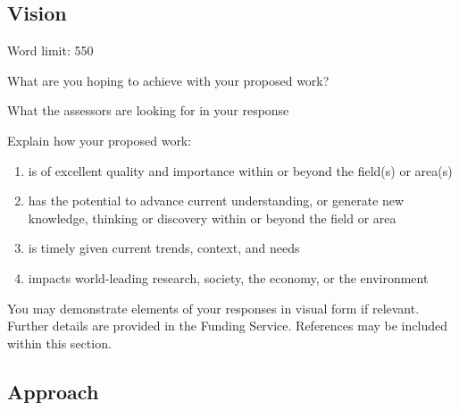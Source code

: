 \documentclass[12pt]{article}
\newenvironment{instruction}{\par\color{red}}{\par}
\begin{document}
\subsection{Vision}
\begin{instruction}
Word limit: 550

What are you hoping to achieve with your proposed work?

What the assessors are looking for in your response

Explain how your proposed work:

\begin{enumerate}

    \item is of excellent quality and importance within or beyond the field(s) or area(s)

    \item has the potential to advance current understanding, or generate new
knowledge, thinking or discovery within or beyond the field or area

    \item is timely given current trends, context, and needs

    \item impacts world-leading research, society, the economy, or the environment

\end{enumerate}

You may demonstrate elements of your responses in visual form if relevant.
Further details are provided in the Funding Service.
References may be included within this section.
\end{instruction}

\begin{bibunit}

\putbib
\end{bibunit}

\pagebreak
\subsection{Approach}
\end{document}
